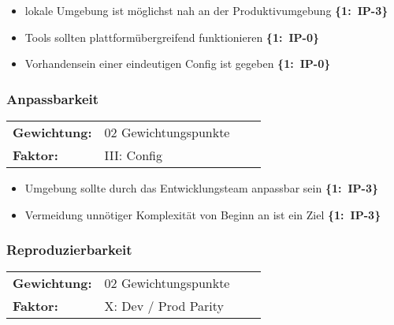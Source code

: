 \begin{flushleft}
    \begin{itemize}
        \item lokale Umgebung ist möglichst nah an der Produktivumgebung \mbox{\textbf{\{1: IP-3\}}}
        \item Tools sollten plattformübergreifend funktionieren \mbox{\textbf{\{1: IP-0\}}}
        \item Vorhandensein einer eindeutigen Config ist gegeben \mbox{\textbf{\{1: IP-0\}}}
    \end{itemize}
\end{flushleft}

\subsubsection{Anpassbarkeit}
\label{subsubsec:AA-04-03-03_req-cnt-adaptability}

\vspace{0.5em}
\begin{tabular}{ll@{}ll@{}}
    \textbf{Gewichtung:}    &   02 Gewichtungspunkte    \\
    \textbf{Faktor:}        &   III: Config             \\
\end{tabular}

\begin{flushleft}
    \begin{itemize}
        \item Umgebung sollte durch das Entwicklungsteam anpassbar sein \mbox{\textbf{\{1: IP-3\}}}
        \item Vermeidung unnötiger Komplexität von Beginn an ist ein Ziel \mbox{\textbf{\{1: IP-3\}}}
    \end{itemize}
\end{flushleft}

\subsubsection{Reproduzierbarkeit}
\label{subsubsec:AA-04-03-04_req-cnt-reproducibility}

\vspace{0.5em}
\begin{tabular}{ll@{}ll@{}}
    \textbf{Gewichtung:}    &   02 Gewichtungspunkte    \\
    \textbf{Faktor:}        &   X: Dev / Prod Parity    \\
\end{tabular}


